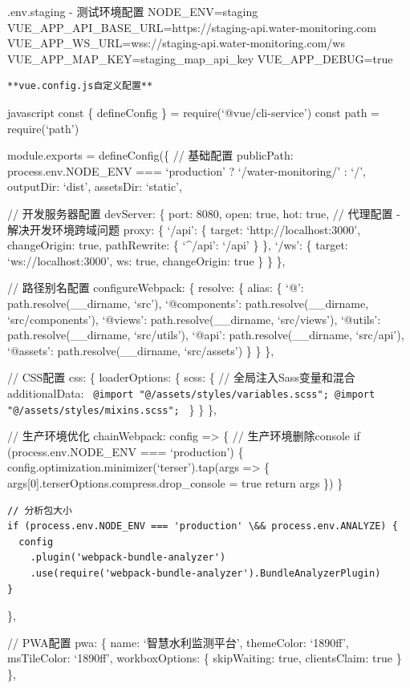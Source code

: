 {{ .env.staging - 测试环境配置 NODE\_ENV=staging VUE\_APP\_API\_BASE\_URL=https://staging-api.water-monitoring.com VUE\_APP\_WS\_URL=wss://staging-api.water-monitoring.com/ws VUE\_APP\_MAP\_KEY=staging\_map\_api\_key VUE\_APP\_DEBUG=true

\begin{lstlisting}
**vue.config.js自定义配置**
\end{lstlisting}

javascript const \{ defineConfig \} = require(`@vue/cli-service') const path = require(`path')

module.exports = defineConfig(\{ // 基础配置 publicPath: process.env.NODE\_ENV === `production' ? `/water-monitoring/' : `/', outputDir: `dist', assetsDir: `static',

// 开发服务器配置 devServer: \{ port: 8080, open: true, hot: true, // 代理配置 - 解决开发环境跨域问题 proxy: \{ `/api': \{ target: `http://localhost:3000', changeOrigin: true, pathRewrite: \{ `\^{}/api': `/api' \} \}, `/ws': \{ target: `ws://localhost:3000', ws: true, changeOrigin: true \} \} \},

// 路径别名配置 configureWebpack: \{ resolve: \{ alias: \{ `@': path.resolve(\_\_dirname, `src'), `@components': path.resolve(\_\_dirname, `src/components'), `@views': path.resolve(\_\_dirname, `src/views'), `@utils': path.resolve(\_\_dirname, `src/utils'), `@api': path.resolve(\_\_dirname, `src/api'), `@assets': path.resolve(\_\_dirname, `src/assets') \} \} \},

// CSS配置 css: \{ loaderOptions: \{ scss: \{ // 全局注入Sass变量和混合 additionalData: \texttt{
          @import "@/assets/styles/variables.scss";
          @import "@/assets/styles/mixins.scss";
        } \} \} \},

// 生产环境优化 chainWebpack: config =\textgreater{} \{ // 生产环境删除console if (process.env.NODE\_ENV === `production') \{ config.optimization.minimizer(`terser').tap(args =\textgreater{} \{ args{[}0{]}.terserOptions.compress.drop\_console = true return args \}) \}

\begin{verbatim}
// 分析包大小
if (process.env.NODE_ENV === 'production' \&& process.env.ANALYZE) {
  config
    .plugin('webpack-bundle-analyzer')
    .use(require('webpack-bundle-analyzer').BundleAnalyzerPlugin)
}
\end{verbatim}

\},

// PWA配置 pwa: \{ name: `智慧水利监测平台', themeColor: `1890ff', msTileColor: `1890ff', workboxOptions: \{ skipWaiting: true, clientsClaim: true \} \},

}}
